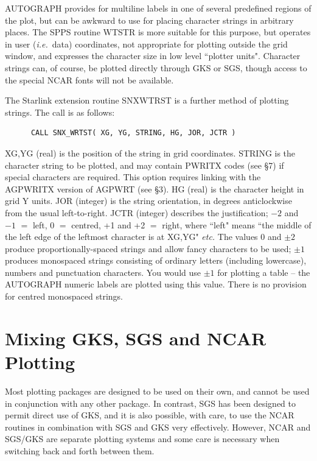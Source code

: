 \documentclass[twoside,11pt]{article}
\renewcommand{\_}{\texttt{\symbol{95}}}
\begin{document}
AUTOGRAPH provides for multiline labels in one of several
predefined regions of the plot, but can be awkward to use for
placing character strings in arbitrary places.
The SPPS routine WTSTR is more suitable for this purpose, but
operates in user ({\em i.e.}\ data) coordinates, not appropriate for
plotting outside the grid window, and expresses the character
size in low level ``plotter units".
Character strings can, of course, be plotted directly
through GKS or SGS, though access to the special NCAR fonts
will not be available.

The Starlink extension routine SNX\_WTRST is a further method
of plotting strings.
The call is as follows:

\begin{verbatim}
      CALL SNX_WRTST( XG, YG, STRING, HG, JOR, JCTR )
\end{verbatim}

XG,YG (real) is the position of the string in grid coordinates.
STRING is the character string to be plotted, and may contain PWRITX codes
(see \S 7) if special characters are required.
This option requires linking with the AGPWRITX
version of AGPWRT (see \S 3).
HG (real) is the character height in grid Y units.
JOR (integer) is the string orientation, in degrees anticlockwise from
the usual left-to-right.
JCTR (integer) describes the justification; $-2$ and $-1$ $=$ left,
0 $=$ centred, +1 and +2 $=$ right, where ``left" means ``the middle of
the left edge of the leftmost character is at XG,YG" {\em etc.}
The values 0 and $\pm2$ produce proportionally-spaced strings and
allow fancy characters to be used;
$\pm1$ produces monospaced strings consisting of ordinary letters
(including lowercase), numbers and punctuation characters.
You would use $\pm1$ for plotting a table -- 
the AUTOGRAPH numeric labels are plotted using this value.
There is no provision for centred monospaced strings.


\section {Mixing GKS, SGS and NCAR Plotting}

Most plotting packages are designed to be used on their own,
and cannot be used in conjunction with any other package.
In contrast, SGS has been designed to permit direct use of
GKS, and it is also possible, with care, to use the NCAR routines
in combination with SGS and GKS very effectively.
However, NCAR and SGS/GKS are separate plotting systems and some
care is necessary when switching back and forth between them.
\end{document}
